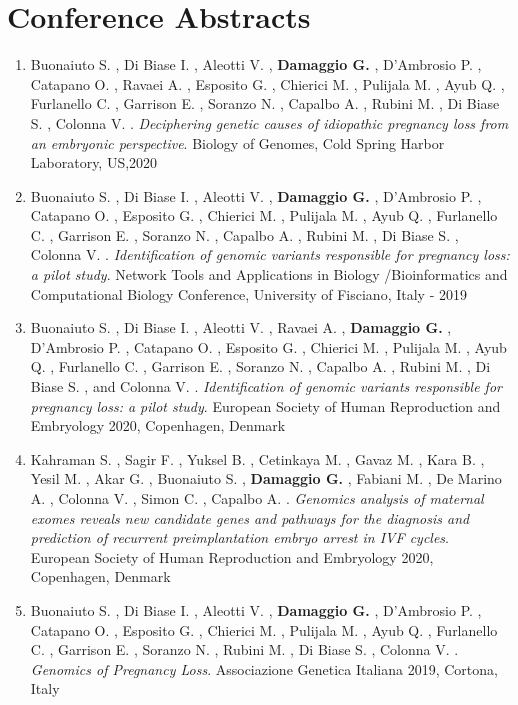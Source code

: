 \documentclass[
11pt, %
oneside, %
english, %
singlespacing, %
headsepline, %
chapterinoneline, %
]{MastersDoctoralThesis} %
\begin{document}
\chapter{Conference Abstracts}
\begin{enumerate}
    \item Buonaiuto S. , Di Biase I. , Aleotti V. , \textbf{Damaggio G.} , D'Ambrosio P. , Catapano O. , Ravaei A. , Esposito G. , Chierici M. , Pulijala M. , Ayub Q. , Furlanello C. , Garrison E. , Soranzo N. , Capalbo A. , Rubini M. , Di Biase S. , Colonna V. . \textit{Deciphering genetic causes of idiopathic pregnancy loss from an embryonic perspective}. Biology of Genomes, Cold Spring Harbor Laboratory, US,2020\\

    \item Buonaiuto S. , Di Biase I. , Aleotti V. , \textbf{Damaggio G.} , D'Ambrosio P. , Catapano O. , Esposito G. , Chierici M. , Pulijala M. , Ayub Q. , Furlanello C. , Garrison E. , Soranzo N. , Capalbo A. , Rubini M. , Di Biase S. , Colonna V. . \textit{Identification of genomic variants responsible for pregnancy loss: a pilot study}. Network Tools and Applications in Biology /Bioinformatics and Computational Biology Conference, University of Fisciano, Italy - 2019\\

    \item Buonaiuto S. , Di Biase I. , Aleotti V. , Ravaei A. , \textbf{Damaggio G.} , D’Ambrosio P. , Catapano O. , Esposito G. , Chierici M. , Pulijala M. , Ayub Q. , Furlanello C. , Garrison E. , Soranzo N. , Capalbo A. , Rubini M. , Di Biase S. , and Colonna V. . \textit{Identification of genomic variants responsible for pregnancy loss: a pilot study}. European Society of Human Reproduction and Embryology 2020, Copenhagen, Denmark\\

    \item Kahraman S. , Sagir F. , Yuksel B. , Cetinkaya M. , Gavaz M. , Kara B. , Yesil M. , Akar G. , Buonaiuto S. , \textbf{Damaggio G. }, Fabiani M. , De Marino A. , Colonna V. , Simon C. , Capalbo A. . \textit {Genomics analysis of maternal exomes reveals new candidate genes and pathways for the diagnosis and prediction of recurrent preimplantation embryo arrest in IVF cycles}. European Society of Human Reproduction and Embryology 2020, Copenhagen, Denmark\\

    \item Buonaiuto S. , Di Biase I. , Aleotti V. , \textbf{Damaggio G.} , D'Ambrosio P. , Catapano O. , Esposito G. , Chierici M. , Pulijala M. , Ayub Q. , Furlanello C. , Garrison E. , Soranzo N. , Rubini M. , Di Biase S. , Colonna V. .  \textit{Genomics of Pregnancy Loss}. Associazione Genetica Italiana 2019, Cortona, Italy\\
\end{enumerate}

\begin{acknowledgements}
\addchaptertocentry{\acknowledgementname}
\end{acknowledgements}
\end{document}

